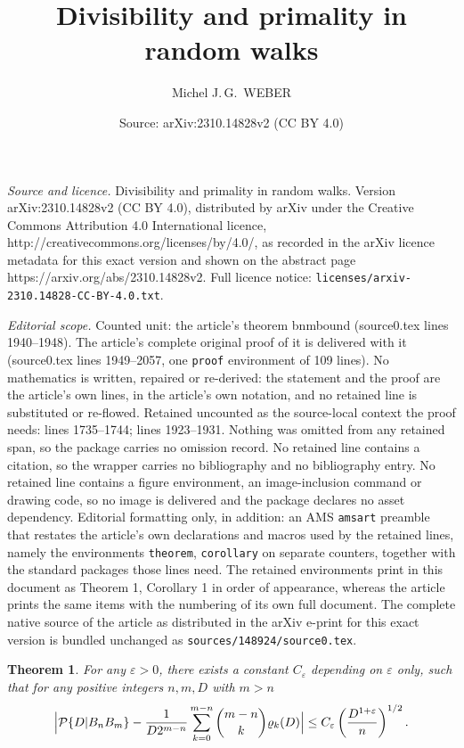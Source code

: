 \documentclass[10pt,a4paper]{amsart}
\title{Divisibility and primality in random walks}
\author{Michel J.\,G.\, WEBER}
\date{Source: arXiv:2310.14828v2 (CC BY 4.0)}
\newtheorem{theorem}{Theorem}
\def\P{{\mathcal P}}
\def \e{{\varepsilon}}
\begin{document}
\maketitle

\noindent\emph{Source and licence.} Divisibility and primality in random walks. Version arXiv:2310.14828v2 (CC BY 4.0), distributed by arXiv under the Creative Commons Attribution 4.0 International licence, http://creativecommons.org/licenses/by/4.0/, as recorded in the arXiv licence metadata for this exact version and shown on the abstract page https://arxiv.org/abs/2310.14828v2. Full licence notice: \texttt{licenses/arxiv-2310.14828-CC-BY-4.0.txt}.\par\smallskip

\noindent\textit{Editorial scope.} Counted unit: the article's theorem bnmbound (source0.tex lines 1940--1948). The article's complete original proof of it is delivered with it (source0.tex lines 1949--2057, one \texttt{proof} environment of 109 lines). No mathematics is written, repaired or re-derived: the statement and the proof are the article's own lines, in the article's own notation, and no retained line is substituted or re-flowed.  Retained uncounted as the source-local context the proof needs: lines 1735--1744; lines 1923--1931.  Nothing was omitted from any retained span, so the package carries no omission record.  No retained line contains a citation, so the wrapper carries no bibliography and no bibliography entry.  No retained line contains a figure environment, an image-inclusion command or drawing code, so no image is delivered and the package declares no asset dependency.  Editorial formatting only, in addition: an AMS \texttt{amsart} preamble that restates the article's own declarations and macros used by the retained lines, namely the environments \texttt{theorem}, \texttt{corollary} on separate counters, together with the standard packages those lines need.  The retained environments print in this document as Theorem 1, Corollary 1 in order of appearance, whereas the article prints the same items with the numbering of its own full document.  The complete native source of the article as distributed in the arXiv e-print for this exact version is bundled unchanged as \texttt{sources/148924/source0.tex}.
 \begin{theorem}\label{p4.5} For any $\e>0$, there exists a constant $C_\e$ depending on $\e$ only, such that  for any
 positive  integers
 $n,m, D$ with 
 $m>n$
\begin{equation}\label{4.11} \Big|\P \{ D|B_nB_m \}-  {1\over D  2^{ m-n}} \sum_{k=0}^{m-n} { {{m-n}\choose {k}}     } \varrho_k(D) 
\Big|
\le C_\e
\left({     D  ^{1 + \e}\over   n }\right)^{1/2 }. 
\end{equation} 
\end{theorem}
\end{document}
